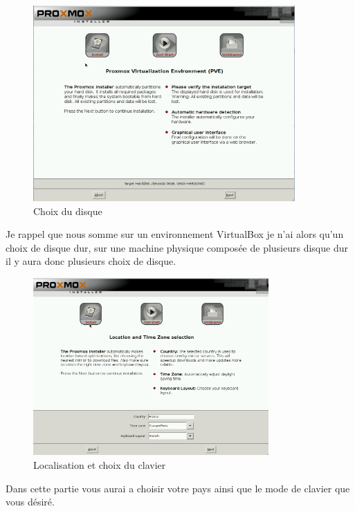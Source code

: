 \documentclass[12pt,a4paper]{article}
\begin{document}
\begin{figure}[!ht]
\center
\includegraphics[width=10cm]{Images/3.PNG}  
\caption{Choix du disque}
\end{figure}

\begin{center}
Je rappel que nous somme sur un environnement VirtualBox je n'ai alors qu'un choix de disque dur, sur une machine physique composée de plusieurs disque dur il y aura donc plusieurs choix de disque. 
\end{center}

\begin{figure}[!ht]
\center
\includegraphics[width=9cm]{Images/4.PNG}  
\caption{Localisation et choix du clavier}
\end{figure}

\begin{center}
Dans cette partie vous aurai a choisir votre pays ainsi que le mode de clavier que vous désiré.\\
\end{center}
\end{document}
